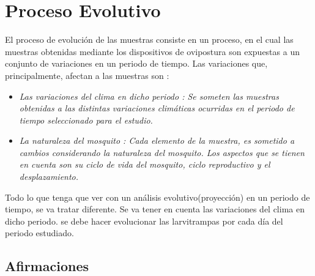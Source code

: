\section{Proceso Evolutivo}
\label{sec:solucion-evolutivo}
El proceso de evolución de las muestras consiste en un proceso, en el cual las muestras obtenidas mediante los dispositivos de ovipostura  son expuestas a un conjunto de variaciones en un periodo de tiempo. Las variaciones que, principalmente, afectan a las muestras son :

\begin{itemize}
    \item \em Las variaciones del clima en dicho periodo \rm: Se someten las muestras obtenidas a las distintas variaciones climáticas ocurridas en el periodo de tiempo seleccionado para el estudio.
    \item \em La naturaleza del mosquito \rm: Cada elemento de la muestra, es sometido a cambios considerando la naturaleza del mosquito. Los aspectos que se tienen en cuenta son su ciclo de vida del mosquito, ciclo reproductivo y el desplazamiento.
\end{itemize}
Todo lo que tenga que ver con un análisis evolutivo(proyección) en un periodo de tiempo, se va tratar diferente. Se va tener en cuenta las variaciones del clima en dicho periodo. se debe hacer evolucionar las larvitrampas por cada día del periodo estudiado.

\subsection{Afirmaciones}

